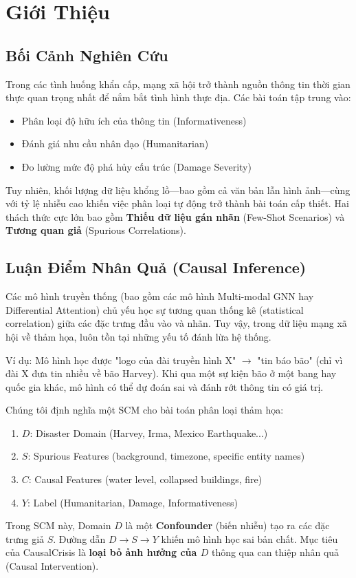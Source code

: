 \documentclass[12pt,a4paper]{article}
\begin{document}
\section{Giới Thiệu}

\subsection{Bối Cảnh Nghiên Cứu}
Trong các tình huống khẩn cấp, mạng xã hội trở thành nguồn thông tin thời gian thực quan trọng nhất để nắm bắt tình hình thực địa. Các bài toán tập trung vào:
\begin{itemize}
    \item Phân loại độ hữu ích của thông tin (Informativeness)
    \item Đánh giá nhu cầu nhân đạo (Humanitarian)
    \item Đo lường mức độ phá hủy cấu trúc (Damage Severity)
\end{itemize}

Tuy nhiên, khối lượng dữ liệu khổng lồ—bao gồm cả văn bản lẫn hình ảnh—cùng với tỷ lệ nhiễu cao khiến việc phân loại tự động trở thành bài toán cấp thiết. Hai thách thức cực lớn bao gồm \textbf{Thiếu dữ liệu gán nhãn} (Few-Shot Scenarios) và \textbf{Tương quan giả} (Spurious Correlations).

\subsection{Luận Điểm Nhân Quả (Causal Inference)}
Các mô hình truyền thống (bao gồm các mô hình Multi-modal GNN hay Differential Attention) chủ yếu học sự tương quan thống kê (statistical correlation) giữa các đặc trưng đầu vào và nhãn. Tuy vậy, trong dữ liệu mạng xã hội về thảm họa, luôn tồn tại những yếu tố đánh lừa hệ thống.

Ví dụ: Mô hình học được "logo của đài truyền hình X" $\rightarrow$ "tin báo bão" (chỉ vì đài X đưa tin nhiều về bão Harvey). Khi qua một sự kiện bão ở một bang hay quốc gia khác, mô hình có thể dự đoán sai và đánh rớt thông tin có giá trị.

\begin{insightbox}
Chúng tôi định nghĩa một SCM cho bài toán phân loại thảm họa:
\begin{enumerate}[leftmargin=*]
    \item $D$: Disaster Domain (Harvey, Irma, Mexico Earthquake...)
    \item $S$: Spurious Features (background, timezone, specific entity names)
    \item $C$: Causal Features (water level, collapsed buildings, fire)
    \item $Y$: Label (Humanitarian, Damage, Informativeness)
\end{enumerate}
Trong SCM này, Domain $D$ là một \textbf{Confounder} (biến nhiễu) tạo ra các đặc trưng giả $S$. Đường dẫn $D \rightarrow S \rightarrow Y$ khiến mô hình học sai bản chất. Mục tiêu của CausalCrisis là \textbf{loại bỏ ảnh hưởng của $D$} thông qua can thiệp nhân quả (Causal Intervention).
\end{insightbox}
\end{document}
